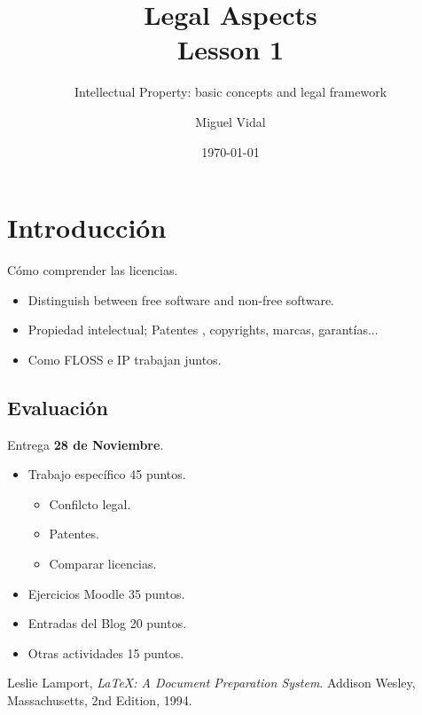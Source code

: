 \documentclass[11pt]{scrartcl}
\title{\textbf{Legal Aspects\\
				Lesson 1}}
\subtitle{Intellectual Property: basic concepts and legal framework}
\author{Miguel Vidal}
\date{\today}
\begin{document}
\maketitle

\section{Introducci\'on}

C\'omo comprender las licencias.

\begin{itemize}

	\item Distinguish between free software and non-free software.
	\item Propiedad intelectual; Patentes , copyrights, marcas, garant\'ias...
	\item Como FLOSS e IP trabajan juntos.
\end{itemize}

\subsection{Evaluaci\'on}

Entrega \textbf{28 de Noviembre}.

\begin{itemize}

	\item Trabajo espec\'ifico 45 puntos.
	\begin{itemize}
		\item Confilcto legal.
		\item Patentes.
		\item Comparar licencias.
	\end{itemize}
	\item Ejercicios Moodle 35 puntos.
	\item Entradas del Blog 20 puntos.
	\item Otras actividades 15 puntos.
\end{itemize}

\begin{thebibliography}{9}

  Leslie Lamport,
  \emph{\LaTeX: A Document Preparation System}.
  Addison Wesley, Massachusetts,
  2nd Edition,
  1994.

\end{thebibliography}
\end{document}
